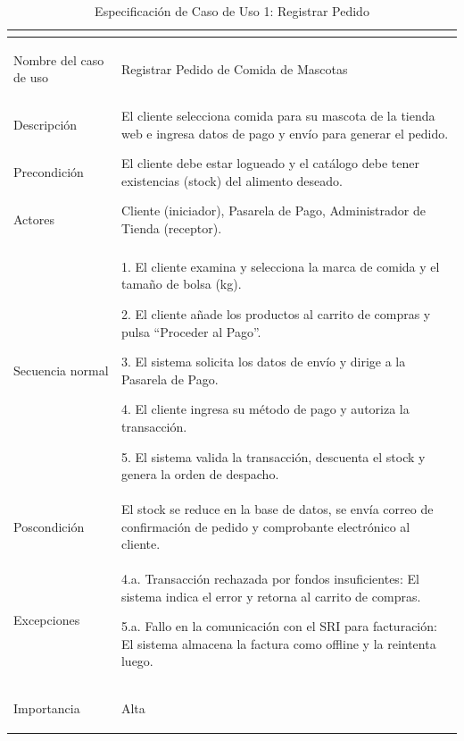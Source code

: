 \documentclass[11pt,a4paper]{article}
\begin{document}
\begin{table}[H]
    \centering
    \small
    \renewcommand{\arraystretch}{1.4}
    \begin{tabularx}{\textwidth}{|>{\bfseries\raggedright\arraybackslash}p{4cm}|L|}
        \hline
          \\
        \hline
        Nombre del caso de uso & Registrar Pedido de Comida de Mascotas \\
        \hline
        Descripción & El cliente selecciona comida para su mascota de la tienda web e ingresa datos de pago y envío para generar el pedido. \\
        \hline
        Precondición & El cliente debe estar logueado y el catálogo debe tener existencias (stock) del alimento deseado. \\
        \hline
        Actores & Cliente (iniciador), Pasarela de Pago, Administrador de Tienda (receptor). \\
        \hline
        Secuencia normal & 
        1. El cliente examina y selecciona la marca de comida y el tamaño de bolsa (kg). \par
        2. El cliente añade los productos al carrito de compras y pulsa ``Proceder al Pago''. \par
        3. El sistema solicita los datos de envío y dirige a la Pasarela de Pago. \par
        4. El cliente ingresa su método de pago y autoriza la transacción. \par
        5. El sistema valida la transacción, descuenta el stock y genera la orden de despacho. \\
        \hline
        Poscondición & El stock se reduce en la base de datos, se envía correo de confirmación de pedido y comprobante electrónico al cliente. \\
        \hline
        Excepciones & 
        4.a. Transacción rechazada por fondos insuficientes: El sistema indica el error y retorna al carrito de compras. \par
        5.a. Fallo en la comunicación con el SRI para facturación: El sistema almacena la factura como offline y la reintenta luego. \\
        \hline
        Importancia & Alta \\
        \hline
    \end{tabularx}
    \caption{Especificación de Caso de Uso 1: Registrar Pedido}
    \label{tab:especificacion_cu1}
\end{table}
\end{document}
